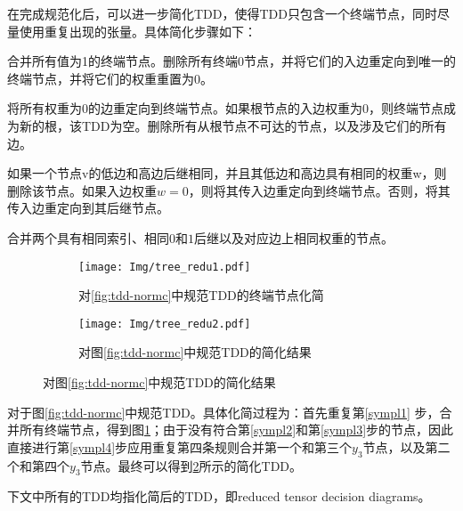 在完成规范化后，可以进一步简化TDD，使得TDD只包含一个终端节点，同时尽量使用重复出现的张量。具体简化步骤如下：
\begin{myen}
    \item 	合并所有值为1的终端节点。删除所有终端$0$节点，并将它们的入边重定向到唯一的终端节点，并将它们的权重重置为$0$。\label{sympl1}
	\item 将所有权重为$0$的边重定向到终端节点。如果根节点的入边权重为$0$，则终端节点成为新的根，该TDD为空。删除所有从根节点不可达的节点，以及涉及它们的所有边。\label{sympl2}
	\item 如果一个节点v的低边和高边后继相同，并且其低边和高边具有相同的权重w，则删除该节点。如果入边权重$w=0$，则将其传入边重定向到终端节点。否则，将其传入边重定向到其后继节点。\label{sympl3}
	\item 合并两个具有相同索引、相同$0$和$1$后继以及对应边上相同权重的节点。\label{sympl4}
\end{myen}

\begin{figure}[!htbp]
    \centering
    \begin{subfigure}[b]{0.4\textwidth}
        \centering
        \texttt{[image: Img/tree\_redu1.pdf]}
        \caption{对\ref{fig:tdd-normc}中规范TDD的终端节点化简}
        \label{fig:tdd-redu1}
    \end{subfigure}
    \begin{subfigure}[b]{0.4\textwidth}
        \centering
        \texttt{[image: Img/tree\_redu2.pdf]}
        \caption{对图\ref{fig:tdd-normc}中规范TDD的简化结果}
        \label{fig:tdd-redu2}
    \end{subfigure}
    \label{fig:tdd-redu}
\end{figure}

对于图\ref{fig:tdd-normc}中规范TDD。具体化简过程为：首先重复第\ref{sympl1} 步，合并所有终端节点，得到图\ref{fig:tdd-redu1}；由于没有符合第\ref{sympl2}和第\ref{sympl3}步的节点，因此直接进行第\ref{sympl4}步应用重复第四条规则合并第一个和第三个$y_3$节点，以及第二个和第四个$y_3$节点。最终可以得到\ref{fig:tdd-redu2}所示的简化TDD。

下文中所有的TDD均指化简后的TDD，即reduced tensor decision diagrams。

